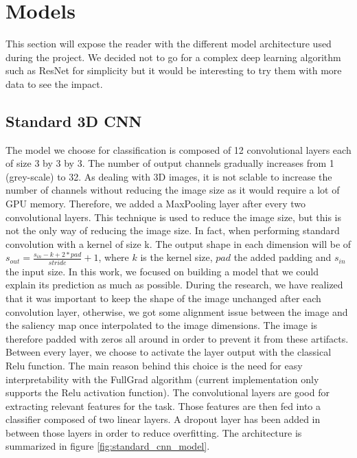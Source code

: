 \chapter{Models}
\label{chap:models}
This section will expose the reader with the different model architecture used during the project. We decided not to go for a complex deep learning algorithm such as ResNet\cite{resNet_he2015deep} for simplicity but it would be interesting to try them with more data to see the impact.

\section{Standard 3D CNN}
\label{sec:standard_cnn}

The model we choose for classification is composed of 12 convolutional layers each of size 3 by 3 by 3. The number of output channels gradually increases from 1 (grey-scale) to 32. As dealing with 3D images, it is not sclable to increase the number of channels without reducing the image size as it would require a lot of GPU memory. Therefore, we added a MaxPooling layer after every two convolutional layers. This technique is used to reduce the image size, but this is not the only way of reducing the image size. In fact, when performing standard convolution with a kernel of size k. The output shape in each dimension will be of $s_{out} = \frac{s_{in} - k + 2* pad}{stride} + 1$, where $k$ is the kernel size, $pad$ the added padding and $s_{in}$ the input size. In this work, we focused on building a model that we could explain its prediction as much as possible. During the research, we have realized that it was important to keep the shape of the image unchanged after each convolution layer, otherwise, we got some alignment issue between the image and the saliency map once interpolated to the image dimensions. The image is therefore padded with zeros all around in order to prevent it from these artifacts. Between every layer, we choose to activate the layer output with the classical Relu\cite{relu_10.5555/3104322.3104425} function. The main reason behind this choice is the need for easy interpretability with the FullGrad algorithm (current implementation only supports the Relu activation function).  
The convolutional layers are good for extracting relevant features for the task. Those features are then fed into a classifier composed of two linear layers. A dropout\cite{dropout_10.5555/2627435.2670313} layer has been added in between those layers in order to reduce overfitting. The architecture is summarized in figure \ref{fig:standard_cnn_model}.


